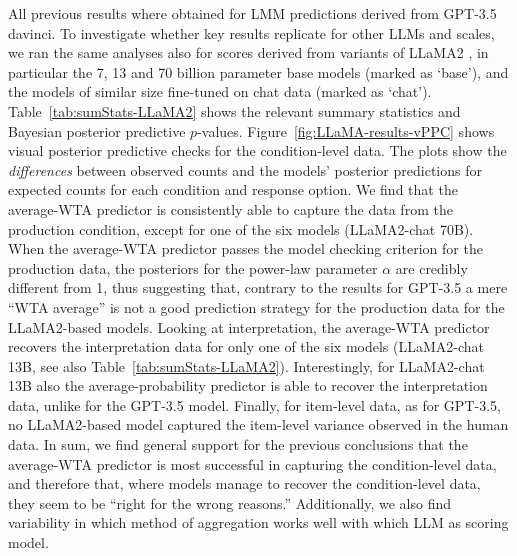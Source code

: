 \documentclass[fleqn]{article}
\begin{document}
All previous results where obtained for LMM predictions derived from GPT-3.5 davinci.
To investigate whether key results replicate for other LLMs and scales, we ran the same analyses also for scores derived from variants of LLaMA2 \citep{TouvronLavril2023:LLaMA:-Open-and}, in particular the 7, 13 and 70 billion parameter base models (marked as `base'), and the models of similar size fine-tuned on chat data (marked as `chat').
Table~\ref{tab:sumStats-LLaMA2} shows the relevant summary statistics and Bayesian posterior predictive $p$-values.
Figure~\ref{fig:LLaMA-results-vPPC} shows visual posterior predictive checks for the condition-level data.
The plots show the \emph{differences} between observed counts and the models' posterior predictions for expected counts for each condition and response option.
We find that the average-WTA predictor is consistently able to capture the data from the production condition, except for one of the six models (LLaMA2-chat 70B).
When the average-WTA predictor passes the model checking criterion for the production data, the posteriors for the power-law parameter $\alpha$ are credibly different from 1, thus suggesting that, contrary to the results for GPT-3.5 a mere ``WTA average'' is not a good prediction strategy for the production data for the LLaMA2-based models.
Looking at interpretation, the average-WTA predictor recovers the interpretation data for only one of the six models (LLaMA2-chat 13B, see also Table~\ref{tab:sumStats-LLaMA2}).
Interestingly, for LLaMA2-chat 13B also the average-probability predictor is able to recover the interpretation data, unlike for the GPT-3.5 model.
Finally, for item-level data, as for GPT-3.5, no LLaMA2-based model captured the item-level variance observed in the human data.
In sum, we find general support for the previous conclusions that the average-WTA predictor is most successful in capturing the condition-level data, and therefore that, where models manage to recover the condition-level data, they seem to be ``right for the wrong reasons.''
Additionally, we also find variability in which method of aggregation works well with which LLM as scoring model.
\end{document}
